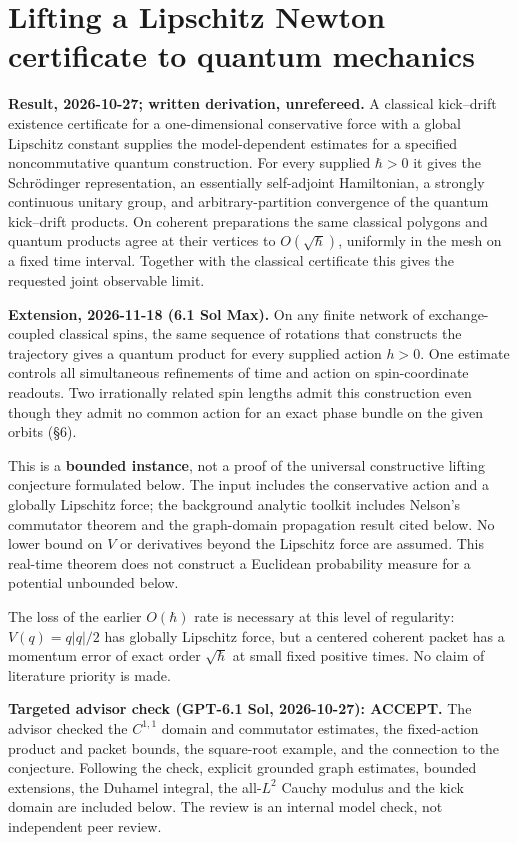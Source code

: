 \documentclass[11pt,a4paper]{article}
\begin{document}
\section{Lifting a Lipschitz Newton certificate to quantum
mechanics}\label{lifting-a-lipschitz-newton-certificate-to-quantum-mechanics}

\textbf{Result, 2026-10-27; written derivation, unrefereed.} A classical
kick--drift existence certificate for a one-dimensional conservative
force with a global Lipschitz constant supplies the model-dependent
estimates for a specified noncommutative quantum construction. For every
supplied \(\hbar>0\) it gives the Schrödinger representation, an
essentially self-adjoint Hamiltonian, a strongly continuous unitary
group, and arbitrary-partition convergence of the quantum kick--drift
products. On coherent preparations the same classical polygons and
quantum products agree at their vertices to \(O(\sqrt\hbar)\), uniformly
in the mesh on a fixed time interval. Together with the classical
certificate this gives the requested joint observable limit.

\textbf{Extension, 2026-11-18 (6.1 Sol Max).} On any finite network of
exchange-coupled classical spins, the same sequence of rotations that
constructs the trajectory gives a quantum product for every supplied
action \(h>0\). One estimate controls all simultaneous refinements of
time and action on spin-coordinate readouts. Two irrationally related
spin lengths admit this construction even though they admit no common
action for an exact phase bundle on the given orbits (§6).

This is a \textbf{bounded instance}, not a proof of the universal
constructive lifting conjecture formulated below. The input includes the
conservative action and a globally Lipschitz force; the background
analytic toolkit includes Nelson's commutator theorem and the
graph-domain propagation result cited below. No lower bound on \(V\) or
derivatives beyond the Lipschitz force are assumed. This real-time
theorem does not construct a Euclidean probability measure for a
potential unbounded below.

The loss of the earlier \(O(\hbar)\) rate is necessary at this level of
regularity: \(V(q)=q|q|/2\) has globally Lipschitz force, but a centered
coherent packet has a momentum error of exact order \(\sqrt\hbar\) at
small fixed positive times. No claim of literature priority is made.

\textbf{Targeted advisor check (GPT-6.1 Sol, 2026-10-27): ACCEPT.} The
advisor checked the \(C^{1,1}\) domain and commutator estimates, the
fixed-action product and packet bounds, the square-root example, and the
connection to the conjecture. Following the check, explicit grounded
graph estimates, bounded extensions, the Duhamel integral, the
all-\(L^2\) Cauchy modulus and the kick domain are included below. The
review is an internal model check, not independent peer review.
\end{document}
